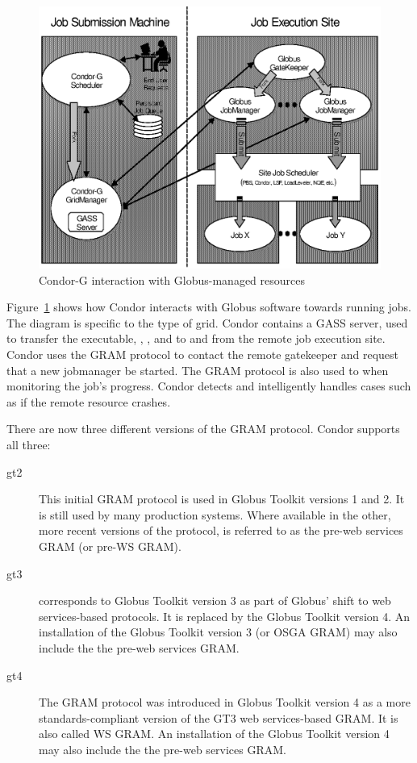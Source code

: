 \begin{figure}[hbt]
\centering
\includegraphics{grids/gfig1.eps}
\caption{\label{fig:condorg}Condor-G interaction with Globus-managed resources}
\end{figure}

Figure~\ref{fig:condorg} shows how Condor interacts with Globus software
towards running jobs.
The diagram is specific to the  type of grid.
Condor contains a GASS server, used to transfer the executable,
, , and  to and from
the remote job execution site.
Condor uses the GRAM protocol to contact the remote gatekeeper
and request that a new jobmanager be started.
The GRAM protocol is also used to when monitoring the job's progress.
Condor detects and intelligently handles cases
such as if the remote resource crashes.

There are now three different versions of the GRAM protocol.
Condor supports all three:
\begin{description}
\item[gt2]
This initial GRAM protocol is used in Globus Toolkit versions 1 and 2.
It is still used by many production systems.
Where available in the other, more recent versions of the protocol,
 is referred to as the pre-web services GRAM 
(or pre-WS GRAM).
\item[gt3]
 corresponds to
Globus Toolkit version 3 as part of
Globus' shift to web services-based protocols.
It is replaced by  the Globus Toolkit version 4.
An installation of the Globus Toolkit version 3 
(or OSGA GRAM) may also
include the the pre-web services GRAM.
\item[gt4]
The GRAM protocol was introduced in Globus Toolkit version 4 as a more
standards-compliant version of the GT3 web services-based GRAM.
It is also called WS GRAM.
An installation of the Globus Toolkit version 4 may also
include the the pre-web services GRAM.
\end{description}

